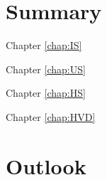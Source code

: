 \section{Summary}

Chapter \ref{chap:IS}

Chapter \ref{chap:US}

Chapter \ref{chap:HS}

Chapter \ref{chap:HVD}


\section{Outlook}










